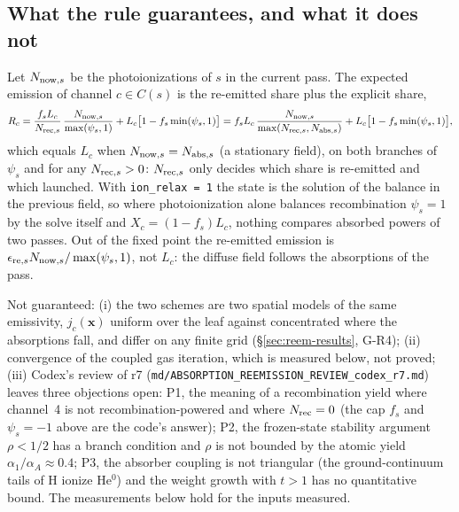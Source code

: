 \documentclass[english,a4paper]{my_memo}
\newcommand{\code}[1]{\texttt{#1}}
\begin{document}
\subsection{What the rule guarantees, and what it does not}
\label{sec:reem-identity}
Let $N_{{\rm now},s}$ be the photoionizations of $s$ in the current pass.
The expected emission of channel $c\in C(s)$ is the re-emitted share plus the
explicit share,
\begin{equation}
 R_c = \frac{f_sL_c}{N_{{\rm rec},s}}\,\frac{N_{{\rm now},s}}{\max(\psi_s,1)}
       + L_c\bigl[1-f_s\min(\psi_s,1)\bigr]
     = f_sL_c\,\frac{N_{{\rm now},s}}{\max(N_{{\rm rec},s},N_{{\rm abs},s})}
       + L_c\bigl[1-f_s\min(\psi_s,1)\bigr],
 \label{eq:reem-identity}
\end{equation}
which equals $L_c$ when $N_{{\rm now},s}=N_{{\rm abs},s}$ (a stationary field),
on both branches of $\psi_s$ and for any $N_{{\rm rec},s}>0$:
$N_{{\rm rec},s}$ only decides which share is re-emitted and which launched.
With \code{ion\_relax = 1} the state is the solution of the balance in the
previous field, so where photoionization alone balances recombination
$\psi_s=1$ by the solve itself and $X_c = (1-f_s)L_c$, nothing compares
absorbed powers of two passes.  Out of the fixed point the re-emitted emission
is $\epsilon_{{\rm re},s}N_{{\rm now},s}/\max(\psi_s,1)$, not $L_c$: the
diffuse field follows the absorptions of the pass.

Not guaranteed: (i) the two schemes are two spatial models of the same
emissivity, $j_c(\mathbf x)$ uniform over the leaf against concentrated where
the absorptions fall, and differ on any finite grid
(\S\ref{sec:reem-results}, G-R4); (ii) convergence of the coupled gas
iteration, which is measured below, not proved; (iii) Codex's review of r7
(\code{md/\allowbreak ABSORPTION\_REEMISSION\_\allowbreak REVIEW\_codex\_r7.md}) leaves three
objections open: P1, the meaning of a recombination yield where channel~4
is not recombination-powered and where $N_{\rm rec}=0$ (the cap $f_s$ and
$\psi_s=-1$ above are the code's answer); P2, the frozen-state stability
argument $\rho<1/2$ has a branch condition and $\rho$ is not bounded by the
atomic yield $\alpha_1/\alpha_A\approx0.4$; P3, the absorber coupling is not
triangular (the ground-continuum tails of H ionize He$^0$) and the weight
growth with $t>1$ has no quantitative bound.  The measurements below hold for
the inputs measured.
\end{document}
